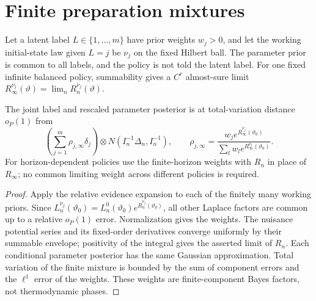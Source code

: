 \section{Finite preparation mixtures}
\label{sec:preparations}
Let a latent label \(L\in\{1,\ldots,m\}\) have prior weights \(w_j>0\),
and let the working initial-state law given \(L=j\) be \(\nu_j\) on the
fixed Hilbert ball. The parameter prior is common to all labels, and the
policy is not told the latent label. For one fixed infinite balanced
policy, summability gives a \(C^r\) almost-sure limit
\(R_\infty^{\nu_j}(\vartheta)=\lim_n R_n^{\nu_j}(\vartheta)\).

\begin{theorem}
\label{thm:preparation-mixture}
The joint label and rescaled parameter posterior is at total-variation
distance \(o_P(1)\) from
\[
 \left(\sum_{j=1}^m\rho_{j,\infty}\delta_j\right)
 \otimes N(I_n^{-1}\Delta_n,I_n^{-1}),\qquad
 \rho_{j,\infty}=
 \frac{w_je^{R_\infty^{\nu_j}(\vartheta_0)}}
      {\sum_l w_le^{R_\infty^{\nu_l}(\vartheta_0)}}.
\]
For horizon-dependent policies use the finite-horizon weights with \(R_n\)
in place of \(R_\infty\); no common limiting weight across different
policies is required.
\end{theorem}
\begin{proof}
Apply the relative evidence expansion to each of the finitely many
working priors. Since
\(L_n^{\nu_j}(\vartheta_0)=L_n^0(\vartheta_0)e^{R_n^{\nu_j}(\vartheta_0)}\),
all other Laplace factors are common up to a relative \(o_P(1)\) error.
Normalization gives the weights. The nuisance potential series and its
fixed-order derivatives converge uniformly by their summable envelope;
positivity of the integral gives the asserted limit of \(R_n\).
Each conditional parameter posterior has the same Gaussian approximation.
Total variation of the finite mixture is bounded by the sum of component
errors and the \(\ell^1\) error of the weights. These weights are
finite-component Bayes factors, not thermodynamic phases.
\end{proof}
